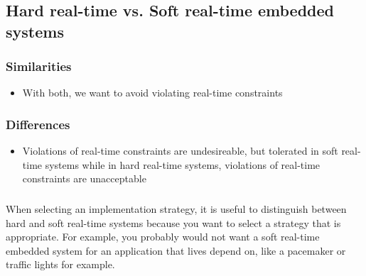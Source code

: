\subsection*{Hard real-time vs. Soft real-time embedded systems}

\subsubsection*{Similarities}
\begin{itemize}
  \item With both, we want to avoid violating real-time constraints
\end{itemize}

\subsubsection*{Differences}
\begin{itemize}
  \item Violations of real-time constraints are undesireable, but tolerated in
    soft real-time systems while in hard real-time systems, violations of
    real-time constraints are unacceptable
\end{itemize}


\subsubsection*{}
When selecting an implementation strategy, it is useful to distinguish between
hard and soft real-time systems because you want to select a strategy that is
appropriate. For example, you probably would not want a soft real-time embedded
system for an application that lives depend on, like a pacemaker or traffic
lights for example. 
